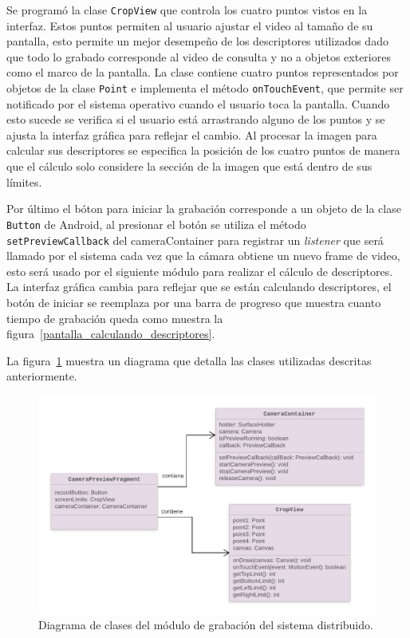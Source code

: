 Se programó la clase \texttt{CropView} que controla los cuatro puntos vistos en la interfaz. Estos puntos permiten al usuario ajustar el video al tamaño de su pantalla, esto permite un mejor desempeño de los descriptores utilizados dado que todo lo grabado corresponde al video de consulta y no a objetos exteriores como el marco de la pantalla. La clase contiene cuatro puntos representados por objetos de la clase \texttt{Point} e implementa el método \texttt{onTouchEvent}, que permite ser notificado por el sistema operativo cuando el usuario toca la pantalla. Cuando esto sucede se verifica si el usuario está arrastrando alguno de los puntos y se ajusta la interfaz gráfica para reflejar el cambio. Al procesar la imagen para calcular sus descriptores se especifica la posición de los cuatro puntos de manera que el cálculo solo considere la sección de la imagen que está dentro de sus límites.

Por último el bóton para iniciar la grabación corresponde a un objeto de la clase \texttt{Button} de Android, al presionar el botón se utiliza el método \texttt{setPreviewCallback} del cameraContainer para registrar un \emph{listener} que será llamado por el sistema cada vez que la cámara obtiene un nuevo frame de video, esto será usado por el siguiente módulo para realizar el cálculo de descriptores. La interfaz gráfica cambia para reflejar que se están calculando descriptores, el botón de iniciar se reemplaza por una barra de progreso que muestra cuanto tiempo de grabación queda como muestra la figura~\ref{pantalla_calculando_descriptores}.

La figura~\ref{diagrama_modulo_captura} muestra un diagrama que detalla las clases utilizadas descritas anteriormente.

	\begin{figure}[!h]
		\centering
		\includegraphics[scale=1.6]{imagenes/cap4/diagrama_modulo_captura.png}
		\caption{Diagrama de clases del módulo de grabación del sistema distribuido.}
		\label{diagrama_modulo_captura}
	\end{figure}

